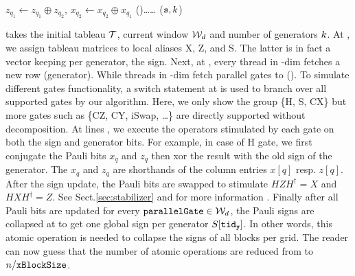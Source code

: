 \documentclass[runningheads]{llncs}
\begin{document}
\begin{algorithm}[t]
{{{{{						\quad\quad$z_{q_1} \gets  z_{q_1} \oplus z_{q_2}$, 
						$x_{q_2} \gets  x_{q_2} \oplus x_{q_1}$
					} \label{ll:CXEnd} 
					\lCase(){\dots}{\dots} \label{ll:otherGates} 
				}
				{\collapseSigns}($\texttt{s}, k$) \label{ll:collapseSigns} 
			}
		}
	}
	\endgroup
\end{algorithm}

\simulateWindow takes the initial tableau $\mathcal{T}$, current window $\mathcal{W}_d$ and number of generators $k$. At , we assign tableau matrices to local aliases X, Z, and S. The latter is in fact a vector keeping per generator, the sign. Next, at , every thread in -dim fetches a new row (generator). While threads in -dim fetch parallel gates to \parGate (). To simulate different gates functionality, a switch statement at  is used to branch over all supported gates by our algorithm. Here, we only show the group \{H, S, CX\} but more gates such as \{CZ, CY, iSwap, \dots\} are directly supported without decomposition.
At lines , we execute the operators stimulated by each gate on both the sign and generator bits. For example, in case of H gate, we first conjugate the Pauli bits $x_q$ and $z_q$ then xor the result with the old sign of the generator. The $x_q$ and $z_q$ are shorthands of the column entries $x[q]$ resp. $z[q]$. After the sign update, the Pauli bits are swapped to stimulate $HZH^{\dagger} = X$ and $HXH^\dagger = Z$. See Sect.\ref{sec:stabilizer} and \cite{aaronson2008improved} for more information . Finally after all Pauli bits are updated for every $\texttt{parallelGate} \in \mathcal{W}_d$, the Pauli signs are collapsed at  to get one global sign per generator $S[\texttt{tid}_{\textbf{\texttt{y}}}]$. In other words, this atomic operation is needed to collapse the signs of all blocks per grid. The reader can now guess that the number of atomic operations are reduced from \numQubits to $n / \texttt{xBlockSize}$.
\end{document}

